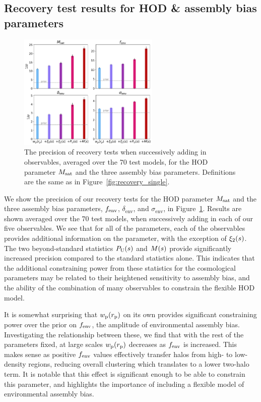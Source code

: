 \subsection{Recovery test results for HOD \& assembly bias parameters}

\begin{figure}[t]
\centering
\includegraphics[width=0.6\textwidth]{recovery_hodab}
\caption{The precision of recovery tests when successively adding in observables, averaged over the 70 test models, for the HOD parameter $M_\mathrm{sat}$ and the three assembly bias parameters. Definitions are the same as in Figure~\ref{fig:recovery_single}.}
\label{fig:recovery_hodab}
\end{figure}

We show the precision of our recovery tests for the HOD parameter $M_\mathrm{sat}$ and the three assembly bias parameters, $f_\mathrm{env}$, $\delta_\mathrm{env}$, and $\sigma_\mathrm{env}$, in Figure~\ref{fig:recovery_hodab}.
Results are shown averaged over the 70 test models, when successively adding in each of our five observables.
We see that for all of the parameters, each of the observables provides additional information on the parameter, with the exception of $\xi_2(s)$.
The two beyond-standard statistics $P_\mathrm{U}(s)$ and $M(s)$ provide significantly increased precision compared to the standard statistics alone.
This indicates that the additional constraining power from these statistics for the cosmological parameters may be related to their heightened sensitivity to assembly bias, and the ability of the combination of many observables to constrain the flexible HOD model.

It is somewhat surprising that $w_\mathrm{p}(r_\mathrm{p})$ on its own provides significant constraining power over the prior on $f_\mathrm{env}$, the amplitude of environmental assembly bias.
Investigating the relationship between these, we find that with the rest of the parameters fixed, at large scales $w_\mathrm{p}(r_\mathrm{p})$ decreases as $f_\mathrm{env}$ is increased. 
This makes sense as positive $f_\mathrm{env}$ values effectively transfer halos from high- to low- density regions, reducing overall clustering which translates to a lower two-halo term.
It is notable that this effect is significant enough to be able to constrain this parameter, and highlights the importance of including a flexible model of environmental assembly bias. 



